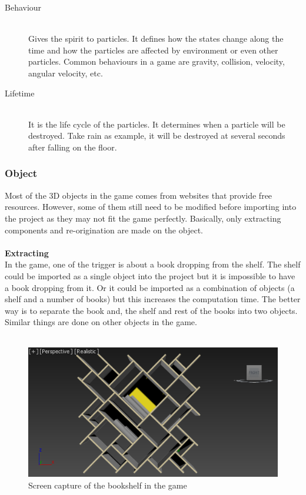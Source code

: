 \documentclass{article}
\begin{document}
\begin{enumerate}
\begin{description}
        \item[Behaviour] \hfill \\
        Gives the spirit to particles. It defines how the states change along the time and how the particles are affected by environment or even other particles. Common behaviours in a game are gravity, collision, velocity, angular velocity, etc.
        
        \item[Lifetime] \hfill \\
        It is the life cycle of the particles. It determines when a particle will be destroyed. Take rain as example, it will be destroyed at several seconds after falling on the floor.
    \end{description}
\end{enumerate}

\clearpage
\subsubsection{Object}
Most of the 3D objects in the game comes from websites that provide free resources. However, some of them still need to be modified before importing into the project as they may not fit the game perfectly. Basically, only extracting components and re-origination are made on the object. \\ \\ 

\textbf{Extracting} \\

In the game, one of the trigger is about a book dropping from the shelf. The shelf could be imported as a single object into the project but it is impossible to have a book dropping from it. Or it could be imported as a combination of objects (a shelf and a number of books) but this increases the computation time. The better way is to separate the book and, the shelf and rest of the books into two objects. Similar things are done on other objects in the game. \\ \\

\begin{figure}[h]
\centering
\includegraphics[width=\textwidth]{3dscene1.png}
\caption{Screen capture of the bookshelf in the game}
\label{fig:3dscene1}
\end{figure}
\bigskip
\end{document}
